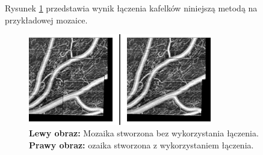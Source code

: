 Rysunek \ref{fig:proponowane_algorytmy:blend_eff} przedstawia wynik łączenia kafelków niniejszą metodą na przykładowej mozaice.

\begin{figure}[H]
  \centering
  \includegraphics[width=8cm]{gfx/blend_eff}
  \caption{\textbf{Lewy obraz:} Mozaika stworzona bez wykorzystania łączenia. \textbf{Prawy obraz:} ozaika stworzona z wykorzystaniem łączenia.}
  \label{fig:proponowane_algorytmy:blend_eff}
\end{figure}
